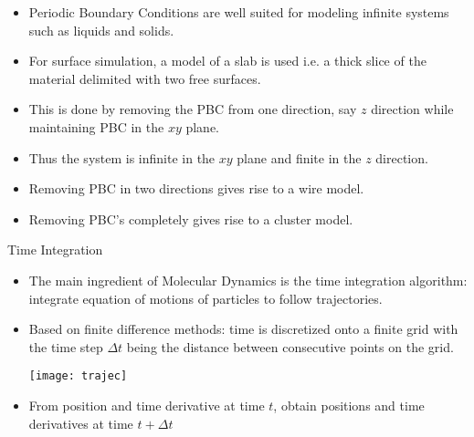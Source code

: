 \documentclass[slidestop,mathserif,compress,xcolor=svgnames]{beamer}
\newenvironment{bblock}[0]
{
\begin{beamerboxesrounded}[upper=uppercol1,lower=lowercol1,shadow=true]}
{\end{beamerboxesrounded}}
\begin{document}
\begin{frame}
  \begin{bblock}{}
    \begin{itemize}
    \item Periodic Boundary Conditions are well suited for modeling infinite systems such as liquids and solids.
    \item For surface simulation, a model of a slab is used i.e. a thick slice of the material delimited with two free surfaces.
    \item This is done by removing the PBC from one direction, say $z$ direction while maintaining PBC in the $xy$ plane.
    \item  Thus the system is infinite in the $xy$ plane and finite in the $z$ direction.
    \item Removing PBC in two directions gives rise to a wire model.
    \item Removing PBC's completely gives rise to a cluster model.
    \end{itemize}
  \end{bblock}
\end{frame}

\begin{frame}
  \begin{bblock}{Time Integration}
    \begin{itemize}
    \item The main ingredient of Molecular Dynamics is the time integration algorithm: integrate equation of motions of particles to follow trajectories.
    \item Based on finite difference methods: time is discretized onto a finite grid with the time step $\Delta t$ being the distance between consecutive points on the grid.
      \begin{center}
        \texttt{[image: trajec]}
      \end{center}
    \item From position and time derivative at time $t$, obtain positions and time derivatives at time $t+\Delta t$
    \end{itemize}
  \end{bblock}
\end{frame}
\end{document}
